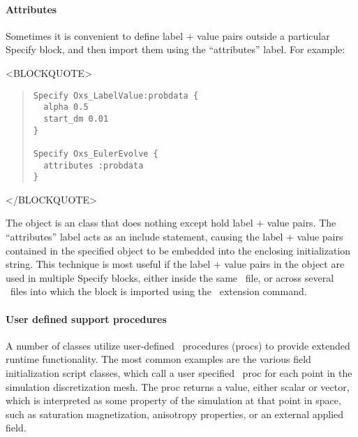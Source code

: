 \paragraph{Attributes}%
\label{par:specifyAttributes}
Sometimes it is convenient to define label + value pairs outside a
particular Specify block, and then import them using the
``attributes'' label.  For example:
\begin{rawhtml}<BLOCKQUOTE>\end{rawhtml}
\begin{quote}
\begin{verbatim}
Specify Oxs_LabelValue:probdata {
  alpha 0.5
  start_dm 0.01
}

Specify Oxs_EulerEvolve {
  attributes :probdata
}
\end{verbatim}
\end{quote}
\begin{rawhtml}</BLOCKQUOTE>\end{rawhtml}
The  object is an  class that does
nothing except hold label + value pairs.  The ``attributes'' label acts as an
include statement, causing the label + value pairs contained in the
specified  object to be embedded into the enclosing
 initialization string.  This technique is most useful if the
label + value pairs in the  object are used in
multiple Specify blocks, either inside the same \MIF\ file, or
across several \MIF\ files into which the  block is
imported using the  \MIF\ extension command.

\paragraph{User defined support procedures}%
\label{par:supportProcs}
A number of  classes utilize user-defined \Tcl\
procedures (procs) to provide extended runtime functionality.  The
most common examples are the various field initialization script
classes, which call a user specified \Tcl\ proc for each point in the
simulation discretization mesh.  The proc returns a value, either
scalar or vector, which is interpreted as some property of the
simulation at that point in space, such as saturation magnetization,
anisotropy properties, or an external applied field.

